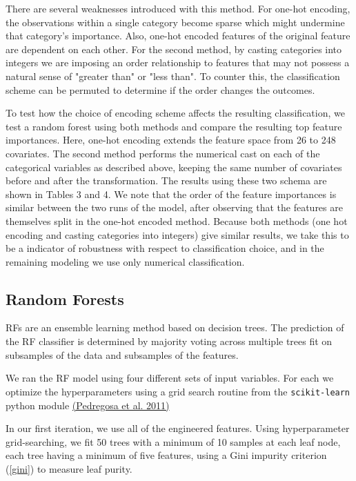 \documentclass{AISB2008}
\begin{document}
There are several weaknesses introduced with this method. For one-hot encoding, the observations within a single category become sparse which might undermine that category's importance. Also, one-hot encoded features of the original feature are dependent on each other. For the second method, by casting categories into integers we are imposing an order relationship to features that may not possess a natural sense of "greater than" or "less than". To counter this, the classification scheme can be permuted to determine if the order changes the outcomes.

To test how the choice of encoding scheme affects the resulting classification, we test a random forest using both methods and compare the resulting top feature importances. Here, one-hot encoding extends the feature space from 26 to 248 covariates. The second method performs the numerical cast on each of the categorical variables as described above, keeping the same number of covariates before and after the transformation. The results using these two schema are shown in Tables 3 and 4. We note that the order of the feature importances is similar between the two runs of the model, after observing that the features are themselves split in the one-hot encoded method. Because both methods (one hot encoding and casting categories into integers) give similar results, we take this to be a indicator of robustness with respect to classification choice, and in the remaining modeling we use only numerical classification.

\subsection{Random Forests}\label{rf} 
RFs are an ensemble learning method based on decision trees. The
prediction of the RF classifier is determined by majority voting
across multiple trees fit on subsamples of the data and subsamples of
the features.

We ran the RF model using four different sets of input variables. For
each we optimize the hyperparameters using a grid search routine from
the {\tt scikit-learn} python module \hyperref[csl:17]{(Pedregosa et
  al. 2011)}

In our first iteration, we use all of the engineered features. Using
hyperparameter grid-searching, we fit 50 trees with a minimum of 10
samples at each leaf node, each tree having a minimum of five
features, using a Gini impurity criterion (\autoref{gini}) to measure
leaf purity.
\end{document}
